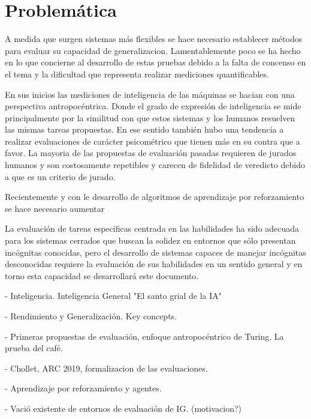 \section*{Problemática}

A medida que surgen sistemas más flexibles se hace necesario establecer métodos para evaluar su capacidad de generalizacion. Lamentablemente poco se ha hecho en lo que concierne al desarrollo de estas pruebas debido a la falta de concenso en el tema y la dificultad que representa realizar mediciones quantificables.

En sus inicios las mediciones de inteligencia de las máquinas se hacian con una perspectiva antropocéntrica. Donde el grado de expresión de inteligencia se mide principalmente por la similitud con que estos sistemas y los humanos resuelven las mismas tareas propuestas. En ese sentido también hubo una tendencia a realizar evaluaciones de carácter psicométrico que tienen más en su contra que a favor. La mayoria de las propuestas de evaluación pasadas requieren de jurados humanos y son costosamente repetibles y carecen de fidelidad de veredicto debido a que es un criterio de jurado.



Recientemente y con le desarrollo de algoritmos de aprendizaje por reforzamiento se hace necesario aumentar 



La evaluación de tareas específicas centrada en las habilidades ha sido adecuada para los sistemas cerrados que buscan la solidez en entornos que sólo presentan incógnitas conocidas, pero el desarrollo de sistemas capaces de manejar incógnitas desconocidas requiere la evaluación de sus habilidades en un sentido general y en torno esta capacidad se desarrollará este documento.














- Inteligencia. Inteligencia General "El santo grial de la IA"

- Rendimiento y Generalización. Key concepts.

- Primeras propuestas de evaluación, enfoque antropocéntrico de Turing. La prueba del café.

- Chollet, ARC 2019, formalizacion de las evaluaciones.

- Aprendizaje por reforzamiento y agentes.

- Vació existente de entornos de evaluación de IG. (motivacion?)